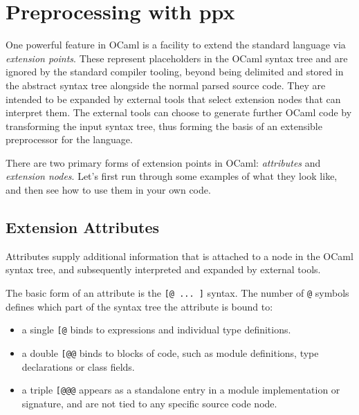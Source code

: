\hypertarget{preprocessing-with-ppx}{%
\section{Preprocessing with ppx}\label{preprocessing-with-ppx}}

One powerful feature in OCaml is a facility to extend the standard
language via \emph{extension points}. These represent placeholders in
the OCaml syntax tree and are ignored by the standard compiler tooling,
beyond being delimited and stored in the abstract syntax tree alongside
the normal parsed source code. They are intended to be expanded by
external tools that select extension nodes that can interpret them. The
external tools can choose to generate further OCaml code by transforming
the input syntax tree, thus forming the basis of an extensible
preprocessor for the language.

There are two primary forms of extension points in OCaml:
\emph{attributes} and \emph{extension nodes}. Let's first run through
some examples of what they look like, and then see how to use them in
your own code.

\hypertarget{extension-attributes}{%
\subsection{Extension Attributes}\label{extension-attributes}}

Attributes supply additional information that is attached to a node in
the OCaml syntax tree, and subsequently interpreted and expanded by
external tools.

The basic form of an attribute is the \passthrough{\lstinline![@ ... ]!}
syntax. The number of \passthrough{\lstinline!@!} symbols defines which
part of the syntax tree the attribute is bound to:

\begin{itemize}
\tightlist
\item
  a single \passthrough{\lstinline![@!} binds to expressions and
  individual type definitions.
\item
  a double \passthrough{\lstinline![@@!} binds to blocks of code, such
  as module definitions, type declarations or class fields.
\item
  a triple \passthrough{\lstinline![@@@!} appears as a standalone entry
  in a module implementation or signature, and are not tied to any
  specific source code node.
\end{itemize}

